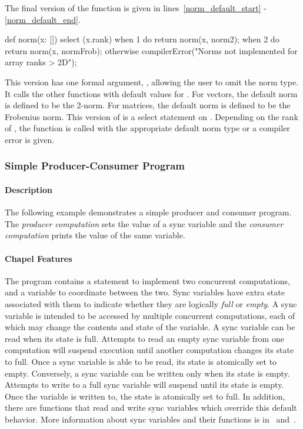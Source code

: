 The final version of the  function is given in 
lines~\ref{norm_default_start} - \ref{norm_default_end}.
\begin{chapel}
  def norm(x: []) { 
    select (x.rank) { 
      when 1 do return norm(x, norm2);  
      when 2 do return norm(x, normFrob); 
      otherwise compilerError("Norms not implemented for array ranks > 2D"); 
    }   
  }  
\end{chapel}
This version has one formal argument, , allowing the user to 
omit the norm type.  It calls the other  functions with default values for 
.  For vectors, the default norm is defined to be the 2-norm.
For matrices, the default norm is defined to be the Frobenius norm.  This 
version of  is a select statement on .  Depending
on the rank of , the  function is called with the
appropriate default norm type or a compiler error is given.

\subsubsection{Simple Producer-Consumer Program}
\paragraph{Description}
The following example demonstrates a simple producer and consumer program.
The {\em producer computation} sets the value of a sync variable and the 
{\em consumer computation} prints the value of the same variable.

\paragraph{Chapel Features}
The program contains a  statement 
to implement two concurrent computations, and a  variable 
to coordinate between the two.
Sync variables have extra state associated with them to
indicate whether they are logically {\em full} or {\em empty}.  
A sync variable
is intended to be accessed by multiple concurrent computations, each of which may
change the contents and state of the variable.  A sync variable
can be read when its state is full.  Attempts to read an empty sync variable from one
computation will suspend execution until another computation changes its state to full.
Once a sync variable is able to be read, its state is atomically set to empty.
Conversely, a sync variable can be written only when its state is empty.  Attempts
to write to a full sync variable will suspend until its state is empty.  Once the variable
is written to, the state is atomically set to full.  In addition, there are
functions that read and write sync variables which override this default behavior.
More information about sync variables and their functions is in~
and~.

